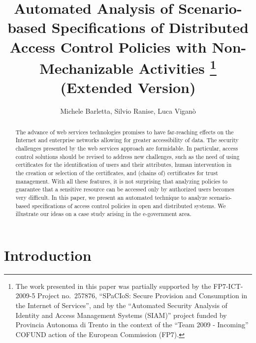 \documentclass[conference]{llncs}
\begin{document}
\title{
Automated Analysis of Scenario-based Specifications of Distributed
Access Control Policies with Non-Mechanizable Activities \thanks{The work presented in this paper was partially supported by the FP7-ICT-2009-5 Project no.~257876,
 ``SPaCIoS: Secure Provision and Consumption in the Internet of
 Services'', and by the ``Automated Security Analysis of Identity and
 Access Management Systems (SIAM)'' project funded by Provincia
 Autonoma di Trento in the context of the ``Team 2009 - Incoming''
 COFUND action of the European Commission (FP7).}
\\
(Extended Version)} 

\author{Michele Barletta, Silvio Ranise, Luca Vigan\`o} 


\maketitle



\begin{abstract}
  The advance of web services technologies promises to have
  far-reaching effects on the Internet and enterprise networks
  allowing for greater accessibility of data.  The security challenges
  presented by the web services approach are formidable.  In
  particular, access control solutions should be revised to address
  new challenges, such as the need of using certificates for the
  identification of users and their attributes, human intervention in
  the creation or selection of the certificates, and (chains of)
  certificates for trust management.  With all these features, it is
  not surprising that analyzing policies to guarantee that a sensitive
  resource can be accessed only by authorized users becomes very
  difficult.  In this paper, we present an automated technique to
  analyze scenario-based specifications of access control policies in
  open and distributed systems.  We illustrate our ideas on a case
  study arising in the e-government area.
\end{abstract}

\section{Introduction}
\end{document}
